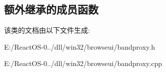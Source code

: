 \subsection*{额外继承的成员函数}


该类的文档由以下文件生成\+:\begin{DoxyCompactItemize}
\item 
E\+:/\+React\+O\+S-\/0../dll/win32/browseui/bandproxy.\+h\item 
E\+:/\+React\+O\+S-\/0../dll/win32/browseui/bandproxy.\+cpp\end{DoxyCompactItemize}
